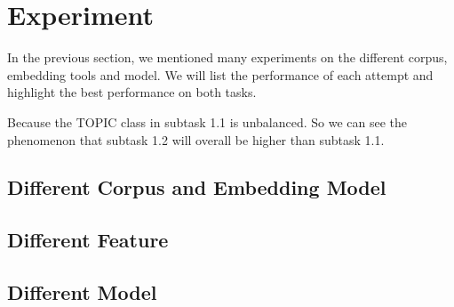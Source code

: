 \section{Experiment}
\label{sec:experiment}

In the previous section, we mentioned many experiments on the different corpus, embedding tools and model. We will list the performance of each attempt and highlight the best performance on both tasks.

Because the TOPIC class in subtask 1.1 is unbalanced. So we can see the phenomenon that subtask 1.2 will overall be higher than subtask 1.1.

\subsection{Different Corpus and Embedding Model}
\label{sec:different_corpus_and_embedding_model}



\subsection{Different Feature}
\label{sec:different_feature}



\subsection{Different Model}
\label{sec:different_model}


